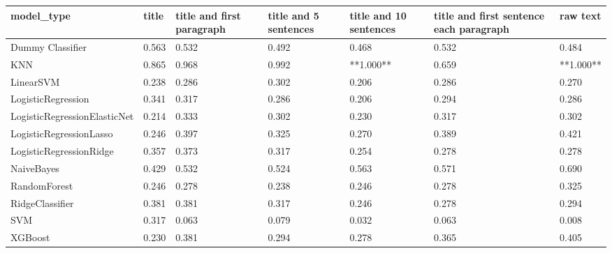 \begin{tabular}{lllllll}
\toprule
                  model\_type & title & title and first paragraph & title and 5 sentences & title and 10 sentences & title and first sentence each paragraph &  raw text \\
\midrule
            Dummy Classifier & 0.563 &                     0.532 &                 0.492 &                  0.468 &                                   0.532 &     0.484 \\
                         KNN & 0.865 &                     0.968 &                 0.992 &              **1.000** &                                   0.659 & **1.000** \\
                   LinearSVM & 0.238 &                     0.286 &                 0.302 &                  0.206 &                                   0.286 &     0.270 \\
          LogisticRegression & 0.341 &                     0.317 &                 0.286 &                  0.206 &                                   0.294 &     0.286 \\
LogisticRegressionElasticNet & 0.214 &                     0.333 &                 0.302 &                  0.230 &                                   0.317 &     0.302 \\
     LogisticRegressionLasso & 0.246 &                     0.397 &                 0.325 &                  0.270 &                                   0.389 &     0.421 \\
     LogisticRegressionRidge & 0.357 &                     0.373 &                 0.317 &                  0.254 &                                   0.278 &     0.278 \\
                  NaiveBayes & 0.429 &                     0.532 &                 0.524 &                  0.563 &                                   0.571 &     0.690 \\
                RandomForest & 0.246 &                     0.278 &                 0.238 &                  0.246 &                                   0.278 &     0.325 \\
             RidgeClassifier & 0.381 &                     0.381 &                 0.317 &                  0.246 &                                   0.278 &     0.294 \\
                         SVM & 0.317 &                     0.063 &                 0.079 &                  0.032 &                                   0.063 &     0.008 \\
                     XGBoost & 0.230 &                     0.381 &                 0.294 &                  0.278 &                                   0.365 &     0.405 \\
\bottomrule
\end{tabular}

